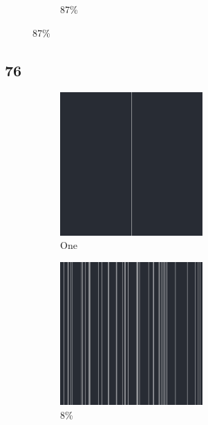 \documentclass[12pt, fleqn]{report}                             %
\theoremstyle{break}                                            %
\begin{document}
\begin{figure}[ht!]
\begin{subfigure}[b]{0.4\linewidth}
          \caption{87\%}
        \end{subfigure}
      \end{figure}


      \clearpage
      \subsection{76}
      \begin{figure}[ht!]
        \centering
        \begin{subfigure}[b]{0.4\linewidth}
          \includegraphics[width=0.6\textwidth]{Images/76/a.png}
          \caption{One}
        \end{subfigure}
        \begin{subfigure}[b]{0.4\linewidth}
          \includegraphics[width=0.6\textwidth]{Images/76/b.png}
          \caption{8\%}
        \end{subfigure}
        \begin{subfigure}[b]{0.4\linewidth}

\end{subfigure}
\end{figure}
\end{document}
